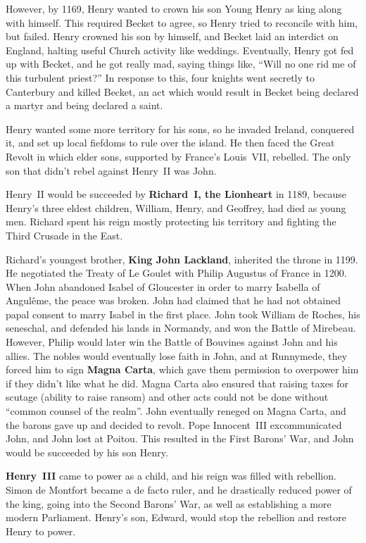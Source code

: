 However, by 1169, Henry wanted to crown his son Young Henry as king along with himself.
This required Becket to agree, so Henry tried to reconcile with him, but failed.
Henry crowned his son by himself, and Becket laid an interdict on England,
halting useful Church activity like weddings.
Eventually, Henry got fed up with Becket, and he got really mad, saying things like,
``Will no one rid me of this turbulent priest?''
In response to this, four knights went secretly to Canterbury and killed Becket,
an act which would result in Becket being declared a martyr and being declared a saint.

Henry wanted some more territory for his sons, so he invaded Ireland, conquered it,
and set up local fiefdoms to rule over the island.
He then faced the Great Revolt in which elder sons, supported by France's Louis~VII, rebelled.
The only son that didn't rebel against Henry~II was John.

Henry~II would be succeeded by \textbf{Richard~I, the Lionheart} in 1189,
because Henry's three eldest children, William, Henry, and Geoffrey, had died as young men.
Richard spent his reign mostly protecting his territory and fighting the Third Crusade in the East.

Richard's youngest brother, \textbf{King John Lackland}, inherited the throne in 1199.
He negotiated the Treaty of Le Goulet with Philip Augustus of France in 1200.
When John abandoned Isabel of Gloucester in order to marry Isabella of Angul\^eme, the peace was broken.
John had claimed that he had not obtained papal consent to marry Isabel in the first place.
John took William de Roches, his seneschal, and defended his lands in Normandy, and won the Battle of Mirebeau.
However, Philip would later win the Battle of Bouvines against John and his allies.
The nobles would eventually lose faith in John, and at Runnymede,
they forced him to sign \textbf{Magna Carta},
which gave them permission to overpower him if they didn't like what he did.
Magna Carta also ensured that raising taxes for scutage (ability to raise ransom) and other acts
could not be done without ``common counsel of the realm''.
John eventually reneged on Magna Carta, and the barons gave up and decided to revolt.
Pope Innocent~III excommunicated John, and John lost at Poitou.
This resulted in the First Barons' War, and John would be succeeded by his son Henry.

\textbf{Henry~III} came to power as a child, and his reign was filled with rebellion.
Simon de Montfort became a de facto ruler, and he drastically reduced power of the king,
going into the Second Barons' War, as well as establishing a more modern Parliament.
Henry's son, Edward, would stop the rebellion and restore Henry to power.

